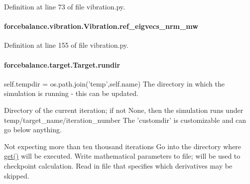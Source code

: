 Definition at line 73 of file vibration.\-py.

\hypertarget{classforcebalance_1_1vibration_1_1Vibration_a6b2b9f1e95bea0edabd46ada819cd005}{
\paragraph[{ref\-\_\-eigvecs\-\_\-nrm\-\_\-mw}]{\setlength{\rightskip}{0pt plus 5cm}forcebalance.\-vibration.\-Vibration.\-ref\-\_\-eigvecs\-\_\-nrm\-\_\-mw\hspace{0.3cm}{\ttfamily [inherited]}}}\label{classforcebalance_1_1vibration_1_1Vibration_a6b2b9f1e95bea0edabd46ada819cd005}


Definition at line 155 of file vibration.\-py.

\hypertarget{classforcebalance_1_1target_1_1Target_a6872de5b2d4273b82336ea5b0da29c9e}{
\paragraph[{rundir}]{\setlength{\rightskip}{0pt plus 5cm}forcebalance.\-target.\-Target.\-rundir\hspace{0.3cm}{\ttfamily [inherited]}}}\label{classforcebalance_1_1target_1_1Target_a6872de5b2d4273b82336ea5b0da29c9e}


self.\-tempdir = os.\-path.\-join('temp',self.\-name) The directory in which the simulation is running -\/ this can be updated. 

Directory of the current iteration; if not None, then the simulation runs under temp/target\-\_\-name/iteration\-\_\-number The 'customdir' is customizable and can go below anything.

Not expecting more than ten thousand iterations Go into the directory where \hyperlink{classforcebalance_1_1target_1_1Target_a1389888302c49d529716cb45b13a6f5a}{get()} will be executed. Write mathematical parameters to file; will be used to checkpoint calculation. Read in file that specifies which derivatives may be skipped. 

